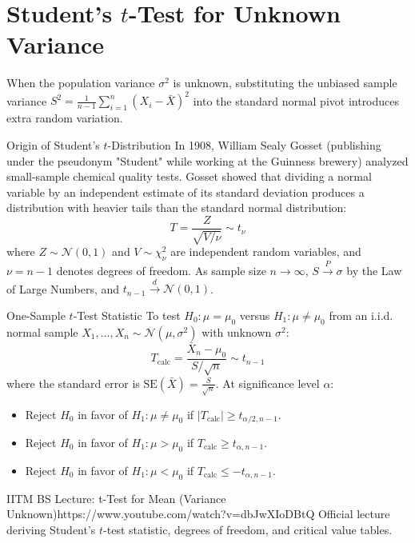 \section{Student's $t$-Test for Unknown Variance}

When the population variance $\sigma^2$ is unknown, substituting the unbiased sample variance $S^2 = \frac{1}{n-1}\sum_{i=1}^n (X_i - \bar{X})^2$ into the standard normal pivot introduces extra random variation.

\begin{intuitionbox}{Origin of Student's $t$-Distribution}
In 1908, William Sealy Gosset (publishing under the pseudonym "Student" while working at the Guinness brewery) analyzed small-sample chemical quality tests. Gosset showed that dividing a normal variable by an independent estimate of its standard deviation produces a distribution with heavier tails than the standard normal distribution:
$$T = \frac{Z}{\sqrt{V / \nu}} \sim t_{\nu}$$
where $Z \sim \mathcal{N}(0, 1)$ and $V \sim \chi_{\nu}^2$ are independent random variables, and $\nu = n-1$ denotes degrees of freedom. As sample size $n \to \infty$, $S \xrightarrow{P} \sigma$ by the Law of Large Numbers, and $t_{n-1} \xrightarrow{d} \mathcal{N}(0, 1)$.
\end{intuitionbox}

\begin{definitionbox}{One-Sample $t$-Test Statistic}
To test $H_0 \colon \mu = \mu_0$ versus $H_1 \colon \mu \neq \mu_0$ from an i.i.d. normal sample $X_1, \dots, X_n \sim \mathcal{N}(\mu, \sigma^2)$ with unknown $\sigma^2$:
$$T_{\text{calc}} = \frac{\bar{X}_n - \mu_0}{S / \sqrt{n}} \sim t_{n-1}$$
where the standard error is $\text{SE}(\bar{X}) = \frac{S}{\sqrt{n}}$. At significance level $\alpha$:
\begin{itemize}
    \item Reject $H_0$ in favor of $H_1 \colon \mu \neq \mu_0$ if $|T_{\text{calc}}| \ge t_{\alpha/2, n-1}$.
    \item Reject $H_0$ in favor of $H_1 \colon \mu > \mu_0$ if $T_{\text{calc}} \ge t_{\alpha, n-1}$.
    \item Reject $H_0$ in favor of $H_1 \colon \mu < \mu_0$ if $T_{\text{calc}} \le -t_{\alpha, n-1}$.
\end{itemize}
\end{definitionbox}

\begin{videocard}{IITM BS Lecture: t-Test for Mean (Variance Unknown)}{https://www.youtube.com/watch?v=dbJwXIoDBtQ}
Official lecture deriving Student's $t$-test statistic, degrees of freedom, and critical value tables.
\end{videocard}

